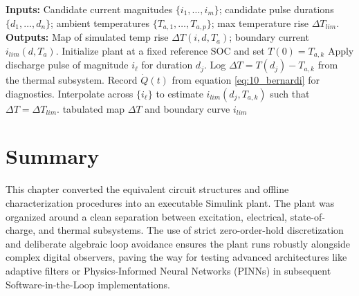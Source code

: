 \begin{algorithm}[htbp]
\caption{Simulated thermal boundary mapping using the coupled plant}
\label{alg:10_boundary_map}
\begin{algorithmic}[1]
\State \textbf{Inputs:} Candidate current magnitudes $\{i_1,\dots,i_m\}$; candidate pulse durations $\{d_1,\dots,d_n\}$; ambient temperatures $\{T_{a,1},\dots,T_{a,p}\}$; max temperature rise $\Delta T_{lim}$.
\State \textbf{Outputs:} Map of simulated temp rise $\Delta T(i, d, T_a)$; boundary current $i_{lim}(d, T_a)$.
    \State Initialize plant at a fixed reference SOC and set $T(0) = T_{a,k}$
            \State Apply discharge pulse of magnitude $i_\ell$ for duration $d_j$.
            \State Log $\Delta T = T(d_j) - T_{a,k}$ from the thermal subsystem.
            \State Record $\dot Q(t)$ from equation \eqref{eq:10_bernardi} for diagnostics.
        \EndFor
        \State Interpolate across $\{i_\ell\}$ to estimate $i_{lim}(d_j, T_{a,k})$ such that $\Delta T = \Delta T_{lim}$.
    \EndFor
\EndFor
\State \Return tabulated map $\Delta T$ and boundary curve $i_{lim}$
\end{algorithmic}
\end{algorithm}

\section{Summary}
\label{sec:10_4}

This chapter converted the equivalent circuit structures and offline characterization procedures into an executable Simulink plant. The plant was organized around a clean separation between excitation, electrical, state-of-charge, and thermal subsystems. The use of strict zero-order-hold discretization and deliberate algebraic loop avoidance ensures the plant runs robustly alongside complex digital observers, paving the way for testing advanced architectures like adaptive filters or Physics-Informed Neural Networks (PINNs) in subsequent Software-in-the-Loop implementations.

